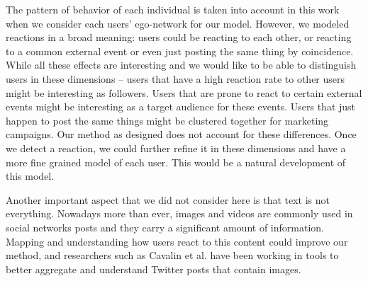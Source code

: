 The pattern of behavior of each individual is taken into account in this work when we consider each users' ego-network for our model. However, we modeled reactions in a broad meaning: users could be reacting to each other, or reacting to a common external event or even just posting the same thing by coincidence. While all these effects are interesting and we would like to be able to distinguish users in these dimensions -- users that have a high reaction rate to other users might be interesting as followers. Users that are prone to react to certain external events might be interesting as a target audience for these events. Users that just happen to post the same things might be clustered together for marketing campaigns. Our method as designed does not account for these differences. Once we detect a reaction, we could further refine it in these dimensions and have a more fine grained model of each user. This would be a natural development of this model.

Another important aspect that we did not consider here is that text is not everything. Nowadays more than ever, images and videos are commonly used in social networks posts and they carry a significant amount of information. Mapping and understanding how users react to this content could improve our method, and researchers such as Cavalin et al. \cite{Cavalin2016} have been working in tools to better aggregate and understand Twitter posts that contain images.

